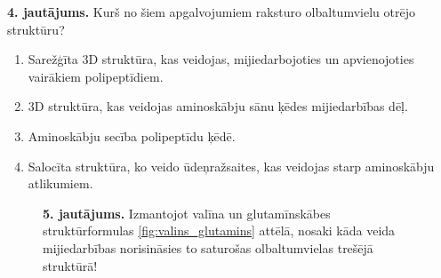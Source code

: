 \documentclass[12pt,a4paper]{article}
\begin{document}
\noindent \textbf{4. jautājums.} Kurš no šiem apgalvojumiem raksturo olbaltumvielu otrējo struktūru?

\begin{enumerate}[label=\Alph*.]
    \item Sarežģīta 3D struktūra, kas veidojas, mijiedarbojoties un apvienojoties vairākiem polipeptīdiem.
    \item 3D struktūra, kas veidojas aminoskābju sānu ķēdes mijiedarbības dēļ.
    \item Aminoskābju secība polipeptīdu ķēdē.
    \item Salocīta struktūra, ko veido ūdeņražsaites, kas veidojas starp aminoskābju atlikumiem.

\end{enumerate}


\begin{figure}[h]
    \centering
    \begin{minipage}[c]{0.55\textwidth}
        \textbf{5. jautājums.} Izmantojot valīna un glutamīnskābes struktūrformulas \ref{fig:valins_glutamins} attēlā, nosaki kāda veida mijiedarbības norisināsies to saturošas olbaltumvielas trešējā struktūrā!
        

\end{minipage}
\end{figure}
\end{document}

